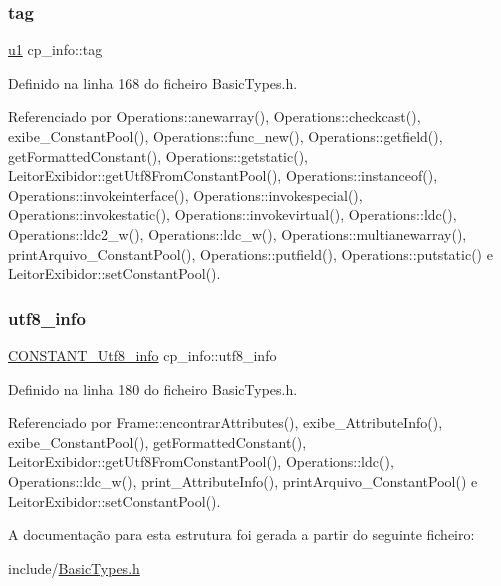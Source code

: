 \subsubsection{\texorpdfstring{tag}{tag}}
{\footnotesize\ttfamily \hyperlink{BasicTypes_8h_ad9f4cdb6757615aae2fad89dab3c5470}{u1} cp\+\_\+info\+::tag}



Definido na linha 168 do ficheiro Basic\+Types.\+h.



Referenciado por Operations\+::anewarray(), Operations\+::checkcast(), exibe\+\_\+\+Constant\+Pool(), Operations\+::func\+\_\+new(), Operations\+::getfield(), get\+Formatted\+Constant(), Operations\+::getstatic(), Leitor\+Exibidor\+::get\+Utf8\+From\+Constant\+Pool(), Operations\+::instanceof(), Operations\+::invokeinterface(), Operations\+::invokespecial(), Operations\+::invokestatic(), Operations\+::invokevirtual(), Operations\+::ldc(), Operations\+::ldc2\+\_\+w(), Operations\+::ldc\+\_\+w(), Operations\+::multianewarray(), print\+Arquivo\+\_\+\+Constant\+Pool(), Operations\+::putfield(), Operations\+::putstatic() e Leitor\+Exibidor\+::set\+Constant\+Pool().

\mbox{\label{structcp__info_a980c5cbcb2aefe984b7a4988f1f71576}} 
\subsubsection{\texorpdfstring{utf8\+\_\+info}{utf8\_info}}
{\footnotesize\ttfamily \hyperlink{structCONSTANT__Utf8__info}{C\+O\+N\+S\+T\+A\+N\+T\+\_\+\+Utf8\+\_\+info} cp\+\_\+info\+::utf8\+\_\+info}



Definido na linha 180 do ficheiro Basic\+Types.\+h.



Referenciado por Frame\+::encontrar\+Attributes(), exibe\+\_\+\+Attribute\+Info(), exibe\+\_\+\+Constant\+Pool(), get\+Formatted\+Constant(), Leitor\+Exibidor\+::get\+Utf8\+From\+Constant\+Pool(), Operations\+::ldc(), Operations\+::ldc\+\_\+w(), print\+\_\+\+Attribute\+Info(), print\+Arquivo\+\_\+\+Constant\+Pool() e Leitor\+Exibidor\+::set\+Constant\+Pool().



A documentação para esta estrutura foi gerada a partir do seguinte ficheiro\+:\begin{DoxyCompactItemize}
\item 
include/\hyperlink{BasicTypes_8h}{Basic\+Types.\+h}\end{DoxyCompactItemize}

